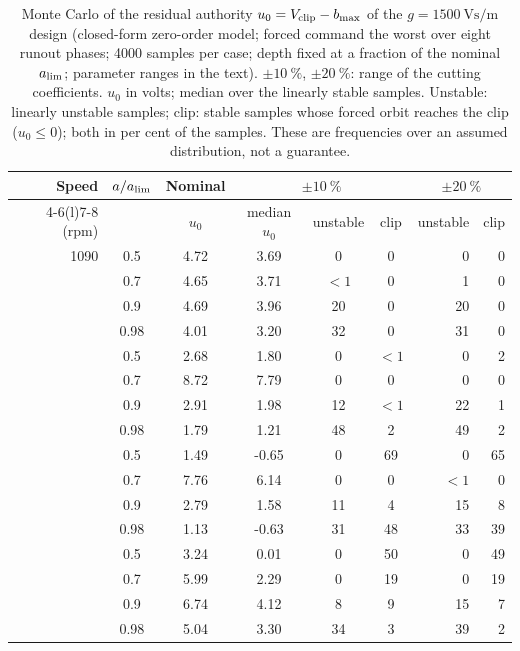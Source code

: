 \begin{table}[!tbp]
  \centering
  \caption{Monte Carlo of the residual authority $u_0=V_{\mathrm{clip}}-b_{\max}$ of the $g=\SI{1500}{\volt\second\per\metre}$ design (closed-form zero-order model; forced command the worst over eight runout phases; 4000 samples per case; depth fixed at a fraction of the nominal $a_{\lim}$; parameter ranges in the text). $\pm\SI{10}{\percent}$, $\pm\SI{20}{\percent}$: range of the cutting coefficients. $u_0$ in volts; median over the linearly stable samples. Unstable: linearly unstable samples; clip: stable samples whose forced orbit reaches the clip ($u_0\le0$); both in per cent of the samples. These are frequencies over an assumed distribution, not a guarantee.}
  \label{tab:mc}
  \small
  \begin{tabular}{@{}rcccccrr@{}}
    \toprule
    Speed & $a/a_{\lim}$ & Nominal & \multicolumn{3}{c}{$\pm\SI{10}{\percent}$} & \multicolumn{2}{c}{$\pm\SI{20}{\percent}$}\\
    \cmidrule(lr){4-6}\cmidrule(l){7-8}
    (rpm) & & $u_0$ & median $u_0$ & unstable & clip & unstable & clip\\
    \midrule
    1090 & 0.5 & 4.72 & 3.69 & 0 & 0 & 0 & 0\\
     & 0.7 & 4.65 & 3.71 & $<1$ & 0 & 1 & 0\\
     & 0.9 & 4.69 & 3.96 & 20 & 0 & 20 & 0\\
     & 0.98 & 4.01 & 3.20 & 32 & 0 & 31 & 0\\
    \addlinespace
    1420 & 0.5 & 2.68 & 1.80 & 0 & $<1$ & 0 & 2\\
     & 0.7 & 8.72 & 7.79 & 0 & 0 & 0 & 0\\
     & 0.9 & 2.91 & 1.98 & 12 & $<1$ & 22 & 1\\
     & 0.98 & 1.79 & 1.21 & 48 & 2 & 49 & 2\\
    \addlinespace
    2500 & 0.5 & 1.49 & -0.65 & 0 & 69 & 0 & 65\\
     & 0.7 & 7.76 & 6.14 & 0 & 0 & $<1$ & 0\\
     & 0.9 & 2.79 & 1.58 & 11 & 4 & 15 & 8\\
     & 0.98 & 1.13 & -0.63 & 31 & 48 & 33 & 39\\
    \addlinespace
    2870 & 0.5 & 3.24 & 0.01 & 0 & 50 & 0 & 49\\
     & 0.7 & 5.99 & 2.29 & 0 & 19 & 0 & 19\\
     & 0.9 & 6.74 & 4.12 & 8 & 9 & 15 & 7\\
     & 0.98 & 5.04 & 3.30 & 34 & 3 & 39 & 2\\
    \bottomrule
  \end{tabular}
\end{table}

